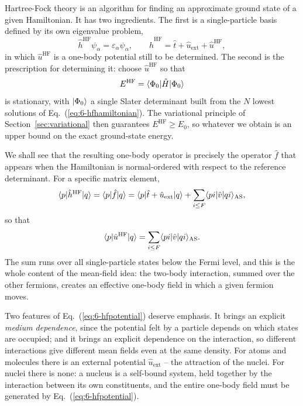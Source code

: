 Hartree-Fock theory is an algorithm for finding an approximate ground state of
a given Hamiltonian.  It has two ingredients.  The first is a single-particle
basis defined by its own eigenvalue problem,
\begin{equation}
  \hat{h}^{\mathrm{HF}}\psi_{\alpha} = \varepsilon_{\alpha}\psi_{\alpha},
  \qquad
  \hat{h}^{\mathrm{HF}} = \hat{t} + \hat{u}_{\mathrm{ext}}
    + \hat{u}^{\mathrm{HF}},
  \label{eq:6-hfhamiltonian}
\end{equation}
in which $\hat{u}^{\mathrm{HF}}$ is a one-body potential still to be
determined.  The second is the prescription for determining it: choose
$\hat{u}^{\mathrm{HF}}$ so that
\begin{equation}
  E^{\mathrm{HF}} = \langle \Phi_0 | \hat{H} | \Phi_0 \rangle
  \label{eq:6-hfenergy}
\end{equation}
is stationary, with $\vert \Phi_0 \rangle$ a single Slater determinant built from the
$N$ lowest solutions of Eq.~(\ref{eq:6-hfhamiltonian}).  The variational
principle of Section~\ref{sec:variational} then guarantees
$E^{\mathrm{HF}}\ge E_0$, so whatever we obtain is an upper bound on the exact
ground-state energy.

We shall see that the resulting one-body operator is precisely the operator
$\hat{f}$ that appears when the Hamiltonian is normal-ordered with respect to
the reference determinant.  For a specific matrix element,
\begin{equation}
  \langle p | \hat{h}^{\mathrm{HF}} | q \rangle
  = \langle p | \hat{f} | q \rangle
  = \langle p | \hat{t}+\hat{u}_{\mathrm{ext}} | q \rangle
    + \sum_{i\le F}\langle pi\vert\hat{v}\vert qi\rangle_{\mathrm{AS}},
  \label{eq:6-fockmatrixelement}
\end{equation}
so that
\begin{equation}
  \langle p | \hat{u}^{\mathrm{HF}} | q \rangle
  = \sum_{i\le F}\langle pi\vert\hat{v}\vert qi\rangle_{\mathrm{AS}} .
  \label{eq:6-hfpotential}
\end{equation}
The sum runs over all single-particle states below the Fermi level, and this
is the whole content of the mean-field idea: the two-body interaction, summed
over the other fermions, creates an effective one-body field in which a given
fermion moves.

Two features of Eq.~(\ref{eq:6-hfpotential}) deserve emphasis.  It brings an
explicit \emph{medium dependence}, since the potential felt by a particle
depends on which states are occupied; and it brings an explicit dependence on
the interaction, so different interactions give different mean fields even at
the same density.  For atoms and molecules there is an external potential
$\hat{u}_{\mathrm{ext}}$ -- the attraction of the nuclei.  For nuclei there is
none: a nucleus is a self-bound system, held together by the interaction
between its own constituents, and the entire one-body field must be generated
by Eq.~(\ref{eq:6-hfpotential}).

